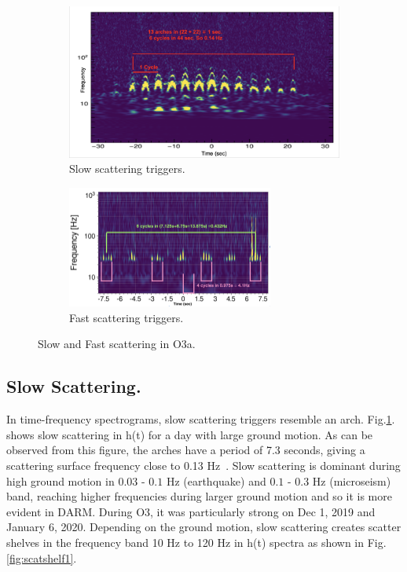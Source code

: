 \documentclass[12pt]{iopart}
\begin{document}
\begin{figure}[h]
   \centering
    \begin{subfigure}[b]{0.45\textwidth}
        \centering
         \includegraphics[width= \textwidth]{slowarch.png}
         \caption{Slow scattering triggers.}
         \label{fig:slowscat}
    \end{subfigure}
    \hfill
    \begin{subfigure}[b]{0.5\textwidth}
        \centering
         \includegraphics[width =\textwidth,height=4cm]{fastscat6.png}
         \caption{Fast scattering triggers.}
         \label{fig:fastscat}
         
    
    \end{subfigure}
    \caption{Slow and Fast scattering in O3a.}
    \label{fig:fastslowscat}
    
\end{figure}

\subsection{Slow Scattering.}
In time-frequency spectrograms, slow scattering triggers resemble an arch.  Fig.\ref{fig:slowscat}. shows slow scattering in h(t) for a day with large ground motion.  As can be observed from this figure, the arches have a period of 7.3 seconds, giving a scattering surface frequency close to 0.13 Hz~\cite{alogsid}. 
Slow scattering is  dominant during high ground motion in $0.03$ - $0.1$ Hz (earthquake) and $0.1$ - $0.3$  Hz (microseism) band, reaching higher frequencies during larger ground motion and so it is more evident in DARM. During O3, it was particularly strong on Dec 1, 2019 and January 6, 2020.  Depending on the ground motion, slow scattering creates scatter shelves in the frequency band 10 Hz to 120 Hz in h(t) spectra as shown in Fig.\ref{fig:scatshelf1}.
\end{document}
